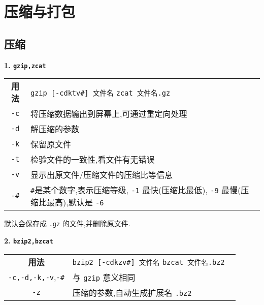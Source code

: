 \section{压缩与打包}
\subsection{压缩}
\par
\textbf{1. \texttt{gzip,zcat}}
\begin{longtable}{c@{: }p{}}\hline\hline

    \textbf{用法} & \verb"gzip [-cdktv#] 文件名" \newline
                    \verb"zcat 文件名.gz" \
    \\

    \texttt{-c}  & 将压缩数据输出到屏幕上,可通过重定向处理 \\

    \texttt{-d} & 解压缩的参数 \\

    \texttt{-k} & 保留原文件 \\

    \texttt{-t} & 检验文件的一致性,看文件有无错误 \\

    \texttt{-v} & 显示出原文件/压缩文件的压缩比等信息\\

    \verb"-#" & \verb"#"是某个数字,表示压缩等级, \texttt{-1} 最快(压缩比最低), \texttt{-9} 最慢(压缩比最高),默认是 \texttt{-6}\\

    \hline
\end{longtable}
默认会保存成 \texttt{.gz} 的文件,并删除原文件.

\par
\textbf{2. \texttt{bzip2,bzcat}}
\begin{longtable}{c@{: }p{}}\hline\hline

    \textbf{用法} & \verb"bzip2 [-cdkzv#] 文件名" \newline
                    \verb"bzcat 文件名.bz2" \
    \\

    \texttt{-c,-d,-k,-v},\verb"-#"  & 与 \texttt{gzip} 意义相同 \\

    \texttt{-z} & 压缩的参数,自动生成扩展名 \texttt{.bz2} \\

    \hline
\end{longtable}

